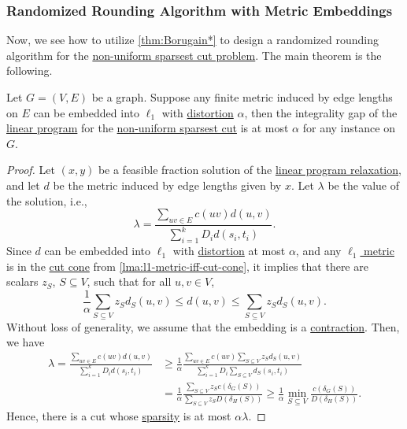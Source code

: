 \subsubsection{Randomized Rounding Algorithm with Metric Embeddings}
Now, we see how to utilize \autoref{thm:Borugain*} to design a randomized rounding algorithm for the \hyperref[prb:non-uniform-sparsest-cut]{non-uniform sparsest cut problem}. The main theorem is the following.

\begin{theorem}\label{thm:Borugain-graph}
	Let \(G = (V, E)\) be a graph. Suppose any finite metric induced by edge lengths on \(E\) can be embedded into \hyperref[def:l1-metric]{\(\ell _1\)} with \hyperref[def:distortion]{distortion} \(\alpha \), then the integrality gap of the \hyperref[eq:non-uniform-sparsest-cut-LP-primal]{linear program} for the \hyperref[prb:non-uniform-sparsest-cut]{non-uniform sparsest cut} is at most \(\alpha \) for any instance on \(G\).
\end{theorem}
\begin{proof}
	Let \((x, y)\) be a feasible fraction solution of the \hyperref[eq:non-uniform-sparsest-cut-LP-primal]{linear program relaxation}, and let \(d\) be the metric induced by edge lengths given by \(x\). Let \(\lambda \) be the value of the solution, i.e.,
	\[
		\lambda = \frac{\sum_{uv \in E} c(uv) d(u, v)}{\sum_{i=1}^{k} D_i d(s_i, t_i)}.
	\]
	Since \(d\) can be embedded into \hyperref[def:l1-metric]{\(\ell _1\)} with \hyperref[def:distortion]{distortion} at most \(\alpha \), and any \hyperref[def:l1-metric]{\(\ell _1\) metric} is in the \hyperref[def:cut-cone]{cut cone} from \autoref{lma:l1-metric-iff-cut-cone}, it implies that there are scalars \(z_S\), \(S \subseteq V\), such that for all \(u, v \in V\),
	\[
		\frac{1}{\alpha } \sum_{S \subseteq V}  z_S d_S(u, v)
		\leq d(u, v)
		\leq \sum_{S \subseteq V} z_S d_S(u, v).
	\]
	Without loss of generality, we assume that the embedding is a \hyperref[def:contraction]{contraction}. Then, we have
	\[
		\begin{split}
			\lambda
			= \frac{\sum_{uv \in E} c(uv) d(u, v)}{\sum_{i=1}^{k} D_i d(s_i, t_i)}
			 & \geq \frac{1}{\alpha } \frac{\sum_{uv \in E} c(uv) \sum_{S \subseteq V} z_S d_S(u, v)}{\sum_{i=1}^{k} D_i \sum_{S \subseteq V} d_S(s_i, t_i)} \\
			 & = \frac{1}{\alpha } \frac{\sum_{S \subseteq V} z_S c(\delta _G(S))}{\sum_{S \subseteq V} z_S D(\delta _H(S))  }
			\geq \frac{1}{\alpha } \min _{S \subseteq V} \frac{c(\delta _G(S))}{D(\delta _H(S)) }.
		\end{split}
	\]
	Hence, there is a cut whose \hyperref[def:sparsity]{sparsity} is at most \(\alpha \lambda \).
\end{proof}

